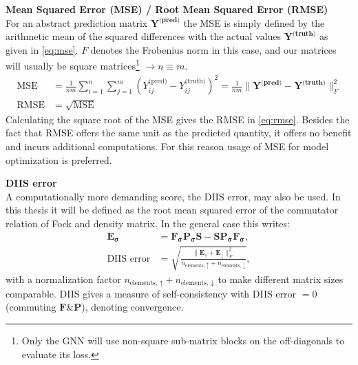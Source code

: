 \textbf{Mean Squared Error (MSE) / Root Mean Squared Error (RMSE)}\\
For an abstract prediction matrix $\mathbf{Y^\text{(pred)}}$ the MSE is simply defined by the arithmetic mean of the squared differences with the actual values $\mathbf{Y^\text{(truth)}}$ as given in \autoref{eq:mse}. $F$ denotes the Frobenius norm in this case, and our matrices will usually be square matrices\footnote{Only the GNN will use non-square sub-matrix blocks on the off-diagonals to evaluate its loss.} $\rightarrow n \equiv m$.  
\begin{subequations}
\begin{align}
\text{MSE} &= \frac{1}{nm} \sum_{i=1}^{n} \sum_{j=1}^{m} \left( Y^\text{(pred)}_{ij} - Y^\text{(truth)}_{ij} \right)^2 = \frac{1}{nm} \|\mathbf{Y^\text{(pred)}} - \mathbf{Y^\text{(truth)}}\|_F^2 \label{eq:mse}\\
\text{RMSE} &= \sqrt{ \text{MSE}}\label{eq:rmse}
\end{align}
\end{subequations}
Calculating the square root of the MSE gives the RMSE in \autoref{eq:rmse}. Besides the fact that RMSE offers the same unit as the predicted quantity, it offers no benefit and incurs additional computations. For this reason usage of MSE for model optimization is preferred. 

\textbf{DIIS error}\\
A computationally more demanding score, the DIIS error, may also be used. In this thesis it will be defined as the root mean squared error of the commutator relation of Fock and density matrix. In the general case this writes: 
\begin{subequations}
\begin{align}
\mathbf{E_\sigma} &= \mathbf{F_\sigma} \mathbf{P_\sigma} \mathbf{S} - \mathbf{S} \mathbf{P_\sigma} \mathbf{F_\sigma},\\
\text{DIIS error} &= \sqrt{\frac{\|\mathbf{E_\uparrow} + \mathbf{E_\downarrow}\|^2_F}{n_\text{elements, $\uparrow$} + n_\text{elements, $\downarrow$}}},\label{eq:diis_error}
\end{align}
\end{subequations}
with a normalization factor $n_\text{elements, $\uparrow$} + n_\text{elements, $\downarrow$}$ to make different matrix sizes comparable. DIIS gives a measure of self-consistency with DIIS error $=0$ (commuting $\mathbf{F} \& \mathbf{P}$), denoting convergence. 
